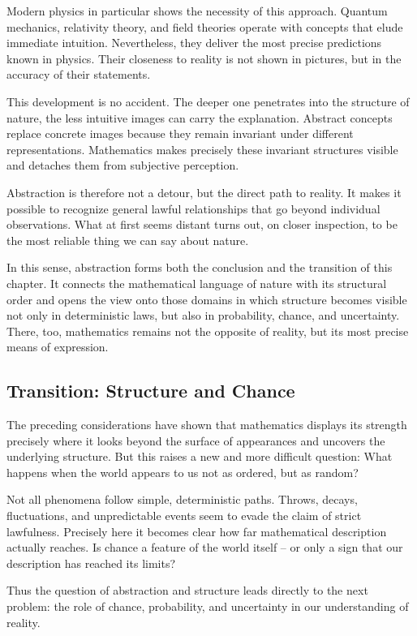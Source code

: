 Modern physics
in particular shows the necessity of this approach.
Quantum mechanics,
relativity theory,
and field theories
operate with concepts
that elude immediate intuition.
Nevertheless, they deliver the most precise predictions
known in physics.
Their closeness to reality
is not shown in pictures,
but in the accuracy of their statements.

This development is no accident.
The deeper one penetrates into the structure of nature,
the less intuitive images can carry the explanation.
Abstract concepts replace concrete images
because they remain invariant
under different representations.
Mathematics makes precisely these invariant structures visible
and detaches them from subjective perception.

Abstraction is therefore not a detour,
but the direct path to reality.
It makes it possible
to recognize general lawful relationships
that go beyond individual observations.
What at first seems distant
turns out, on closer inspection,
to be the most reliable thing
we can say about nature.

In this sense, abstraction forms
both the conclusion and the transition of this chapter.
It connects the mathematical language of nature
with its structural order
and opens the view onto those domains
in which structure becomes visible not only in deterministic laws,
but also in probability,
chance,
and uncertainty.
There, too, mathematics remains
not the opposite of reality,
but its most precise means of expression.

\subsection*{Transition: Structure and Chance}

The preceding considerations have shown
that mathematics displays its strength precisely where
it looks beyond the surface of appearances
and uncovers the underlying structure.
But this raises a new and more difficult question:
What happens
when the world appears to us not as ordered,
but as random?

Not all phenomena follow simple,
deterministic paths.
Throws, decays, fluctuations, and unpredictable events
seem to evade the claim of strict lawfulness.
Precisely here it becomes clear
how far mathematical description actually reaches.
Is chance a feature of the world itself --
or only a sign
that our description has reached its limits?

Thus the question of abstraction and structure
leads directly to the next problem:
the role of chance,
probability,
and uncertainty in our understanding of reality.